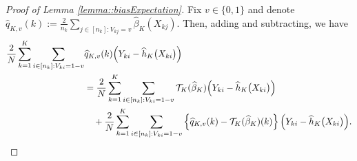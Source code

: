 \documentclass[11pt]{article}
\theoremstyle{plain}
\theoremstyle{definition}
\theoremstyle{remark}
\theoremstyle{definition}
\begin{document}
\begin{proof}[Proof of Lemma \ref{lemma::biasExpectation}]
Fix $v \in \{0,1\}$ and denote $\widehat{q}_{K,v}(k) := \frac{2}{n_k}  \sum_{j \in [n_k]:  V_{kj} = v} \widehat{\beta}_K(X_{kj})$. Then, adding and subtracting, we have
    \begin{align*}
         \frac{2}{N}  \sum_{k=1}^K \sum_{i \in [n_k]: V_{ki} = 1-v} & \widehat{q}_{K,v}(k) \Bigl(Y_{ki} - \widehat{h}_K\bigl(X_{ki}\bigr)\Bigr)\\
         &=  \frac{2}{N}   \sum_{k=1}^K \sum_{i \in [n_k]: V_{ki} = 1-v}  \mathcal{T}_{K}(\widehat{\beta}_K) \Bigl(Y_{ki} - \widehat{h}_K\bigl(X_{ki}\bigr)\Bigr) \\
         & \quad +  \frac{2}{N}   \sum_{k=1}^K \sum_{i \in [n_k]: V_{ki} = 1-v}  \left\{\widehat{q}_{K,v}(k) - \mathcal{T}_{K}(\widehat{\beta}_K)(k)\right\} \Bigl(Y_{ki} - \widehat{h}_K\bigl(X_{ki}\bigr)\Bigr).
    \end{align*} 


 



\end{proof}
\end{document}
